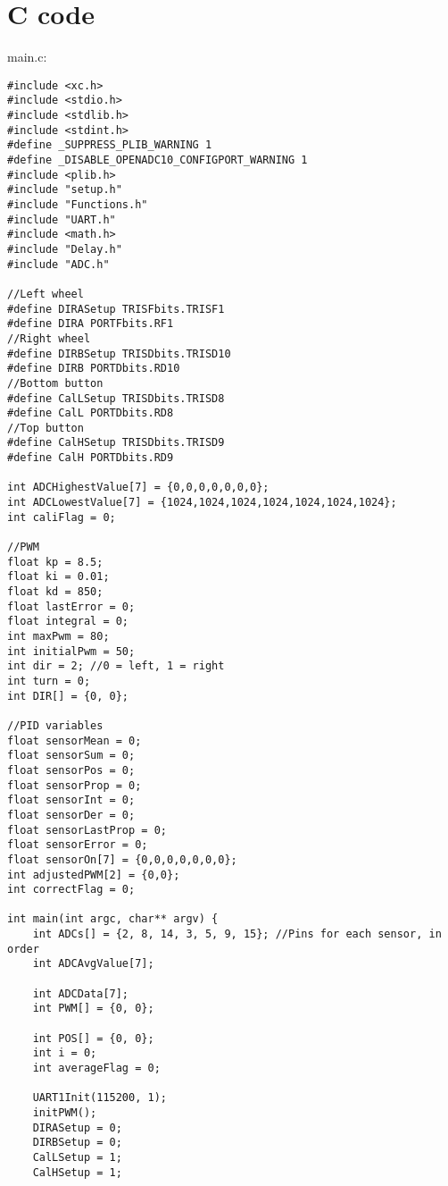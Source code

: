 \section{C code}
main.c:

\begin{lstlisting}
#include <xc.h>
#include <stdio.h>
#include <stdlib.h>
#include <stdint.h>
#define _SUPPRESS_PLIB_WARNING 1   
#define _DISABLE_OPENADC10_CONFIGPORT_WARNING 1  
#include <plib.h>
#include "setup.h"
#include "Functions.h"
#include "UART.h"
#include <math.h>
#include "Delay.h"
#include "ADC.h"

//Left wheel
#define DIRASetup TRISFbits.TRISF1
#define DIRA PORTFbits.RF1
//Right wheel
#define DIRBSetup TRISDbits.TRISD10
#define DIRB PORTDbits.RD10
//Bottom button
#define CalLSetup TRISDbits.TRISD8
#define CalL PORTDbits.RD8
//Top button
#define CalHSetup TRISDbits.TRISD9
#define CalH PORTDbits.RD9

int ADCHighestValue[7] = {0,0,0,0,0,0,0};
int ADCLowestValue[7] = {1024,1024,1024,1024,1024,1024,1024};
int caliFlag = 0;

//PWM
float kp = 8.5; 
float ki = 0.01;
float kd = 850; 
float lastError = 0;
float integral = 0;
int maxPwm = 80;
int initialPwm = 50;
int dir = 2; //0 = left, 1 = right
int turn = 0;
int DIR[] = {0, 0};

//PID variables
float sensorMean = 0;
float sensorSum = 0;
float sensorPos = 0;
float sensorProp = 0;
float sensorInt = 0;
float sensorDer = 0;
float sensorLastProp = 0;
float sensorError = 0;
float sensorOn[7] = {0,0,0,0,0,0,0};
int adjustedPWM[2] = {0,0};
int correctFlag = 0;

int main(int argc, char** argv) {
    int ADCs[] = {2, 8, 14, 3, 5, 9, 15}; //Pins for each sensor, in order
    int ADCAvgValue[7];

    int ADCData[7];
    int PWM[] = {0, 0};

    int POS[] = {0, 0};
    int i = 0;
    int averageFlag = 0;
    
    UART1Init(115200, 1);
    initPWM();
    DIRASetup = 0;
    DIRBSetup = 0;
    CalLSetup = 1;
    CalHSetup = 1;
    

\end{lstlisting}
